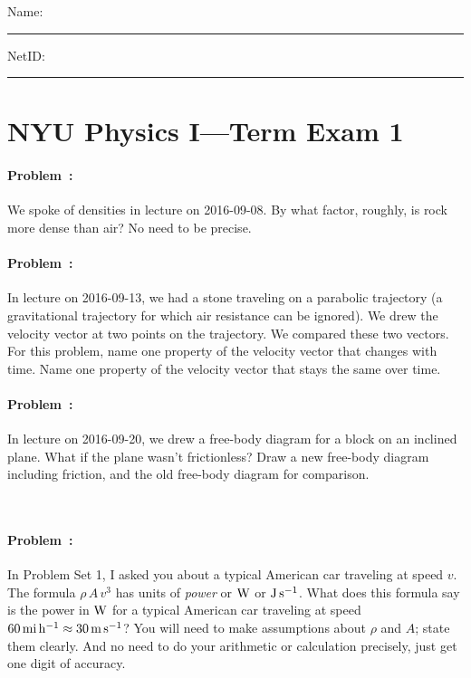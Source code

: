 \documentclass[12pt]{article}
\begin{document}
\sloppy\sloppypar\raggedbottom\frenchspacing\pagestyle{empty}

\noindent
Name: \rule[-1ex]{0.55\textwidth}{0.1pt}
NetID: \rule[-1ex]{0.2\textwidth}{0.1pt}

\section*{NYU Physics I---Term Exam 1}

\paragraph{Problem~\theproblem:}%
We spoke of densities in lecture on 2016-09-08. By what factor,
roughly, is rock more dense than air? No need to be precise.

\vfill

\paragraph{Problem~\theproblem:}%
In lecture on 2016-09-13, we had a stone traveling on a parabolic
trajectory (a gravitational trajectory for which air resistance can be
ignored). We drew the velocity vector at two points on the
trajectory. We compared these two vectors. For this problem, name one
property of the velocity vector that changes with time. Name one
property of the velocity vector that stays the same over time.

\vfill

\paragraph{Problem~\theproblem:}%
In lecture on 2016-09-20, we drew a free-body diagram for a block on
an inclined plane. What if the plane wasn't frictionless? Draw a new
free-body diagram including friction, and the old free-body diagram
for comparison.

\vfill
~

\clearpage
\paragraph{Problem~\theproblem:}%
In Problem Set 1, I asked you about a typical American car traveling
at speed $v$.  The formula $\rho\,A\,v^3$ has units of \emph{power} or
$\mathrm{W}$ or $\mathrm{J}\,\mathrm{s}^{-1}$.  What does this formula say is the power in
$\mathrm{W}$ for a typical American car traveling at speed $60\,\mathrm{mi}\,\mathrm{h}^{-1}\approx
30\,\mathrm{m}\,\mathrm{s}^{-1}$? You will need to make assumptions about $\rho$ and $A$; state them
clearly. And no need to do your arithmetic or calculation precisely, just
get one digit of accuracy.
\end{document}
